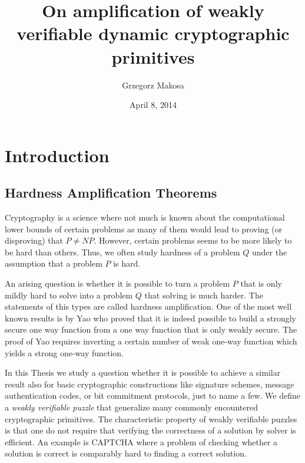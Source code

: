 \documentclass[11pt,a4paper,titlepage]{memoir}
\title{On amplification of weakly verifiable dynamic cryptographic primitives}
\author{Grzegorz Makosa}
\date{April 8, 2014}
\begin{document}
\frontmatter

%

\cleartorecto
\tableofcontents
\mainmatter

\chapter{Introduction}
\section{Hardness Amplification Theorems}
Cryptography is a science where not much is known about the computational lower bounds of certain problems
as many of them would lead to proving (or disproving) that $P \neq NP$.
However, certain problems seems to be more likely to be hard than others.
Thus, we often study hardness of a problem $Q$ under the assumption that a problem $P$ is hard.

An arising question is whether it is possible to turn a problem $P$ that is only mildly hard to solve into a problem $Q$
that solving is much harder. The statements of this types are called hardness amplification.
One of the most well known results is by Yao who proved that it is indeed possible to build a strongly secure one way function
from a one way function that is only weakly secure. The proof of Yao requires inverting a certain number of weak one-way function
which yields a strong one-way function.

In this Thesis we study a question whether it is possible to achieve a similar result also for basic cryptographic constructions
like signature schemes, message authentication codes, or bit commitment protocols, just to name a few.
We define a \textit{weakly verifiable puzzle} that generalize many commonly encountered cryptographic primitives.
The characteristic property of weakly verifiable puzzles is that one do not require that verifying the correctness of a solution by solver is efficient.
An example is CAPTCHA where a problem of checking whether a solution is correct is comparably hard to finding a correct solution.
\end{document}
